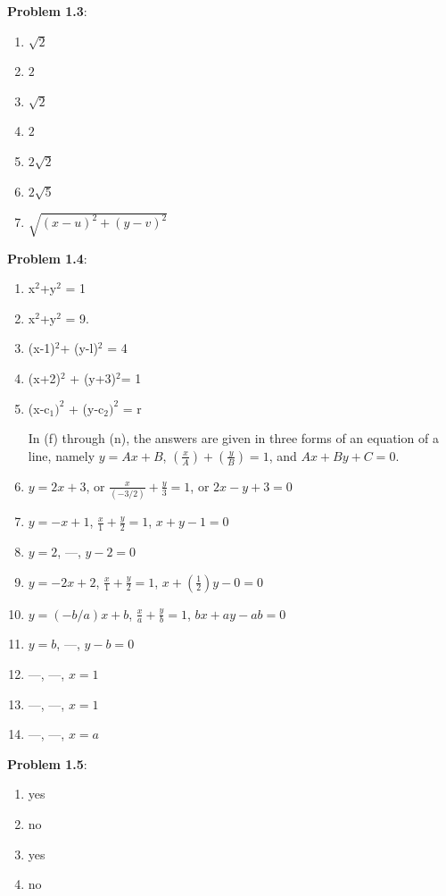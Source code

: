 \documentclass[english]{book}
\begin{document}
\textbf{Problem 1.3}:
\begin{enumerate}[\hspace{1cm}(a)]
  \item $\sqrt{2}$ 
  \item $2$
  \item $\sqrt{2}$
  \item $2$
  \item $2 \sqrt{2}$
  \item $2 \sqrt{5}$ 
  \item $\sqrt{ (x - u)^{2} + (y - v)^{2} }$
\end{enumerate}

\textbf{Problem 1.4}:
\begin{enumerate}[\hspace{1cm}(a)]
  \item x$^{2}$+y$^{2}$ = 1 
  \item x$^{2}$+y$^{2}$ = 9. 
  \item (x-1)$^{2 }$+ (y-l)$^{2}$ = 4 
  \item (x+2)$^{2}$ + (y+3)$^{2 }$= 1
  \item (x-c$_{1})^{2}$ + (y-c$_{2})^{2}$ = r

    In (f) through (n), the answers are given in three forms of an equation of a line, namely $y=Ax + B$, $(\frac{x}{A}) + (\frac{y}{B}) = 1$, and $Ax + By + C = 0$.

  \item $y = 2x+3$, or $\frac{x}{(-3/2)} + \frac{y}{3} = 1$, or $2x - y + 3 = 0$
  \item $y = -x + 1$, $\frac{x}{1} + \frac{y}{2} = 1$, $x + y - 1 = 0$
  \item $y = 2$, ---, $y - 2 = 0$
  \item $y = -2x + 2$, $\frac{x}{1} + \frac{y}{2} = 1$, $x + (\frac{1}{2})y - 0 = 0$
  \item $y = (-b/a)x + b$, $\frac{x}{a} + \frac{y}{b} = 1$, $bx + ay - ab = 0$
  \item $y = b$, ---, $y - b = 0$
  \item ---, ---, $x = 1$
  \item ---, ---, $x = 1$
  \item ---, ---, $x = a$
\end{enumerate}

\textbf{Problem 1.5}:
\begin{enumerate}[\hspace{1cm}(a)]
  \item yes
  \item no
  \item yes
  \item no
\end{enumerate}
\end{document}
